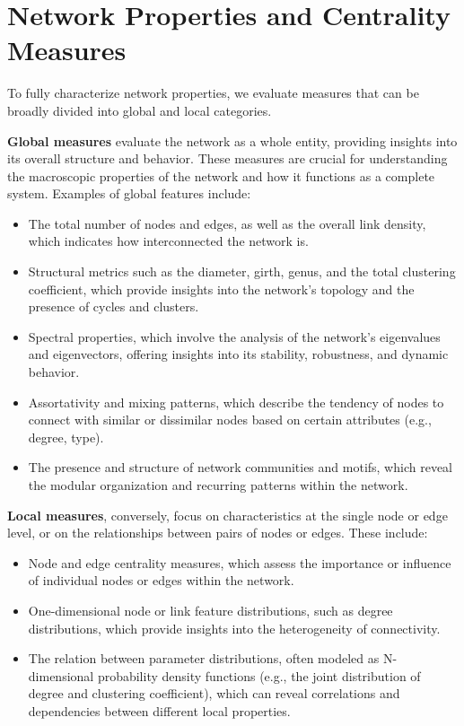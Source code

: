 \chapter{Network Properties and Centrality Measures}

To fully characterize network properties, we evaluate measures that can be broadly divided into global and local categories.

\textbf{Global measures} evaluate the network as a whole entity, providing insights into its overall structure and behavior. These measures are crucial for understanding the macroscopic properties of the network and how it functions as a complete system. Examples of global features include:
\begin{itemize}
    \item The total number of nodes and edges, as well as the overall link density, which indicates how interconnected the network is.
    \item Structural metrics such as the diameter, girth, genus, and the total clustering coefficient, which provide insights into the network's topology and the presence of cycles and clusters.
    \item Spectral properties, which involve the analysis of the network's eigenvalues and eigenvectors, offering insights into its stability, robustness, and dynamic behavior.
    \item Assortativity and mixing patterns, which describe the tendency of nodes to connect with similar or dissimilar nodes based on certain attributes (e.g., degree, type).
    \item The presence and structure of network communities and motifs, which reveal the modular organization and recurring patterns within the network.
\end{itemize}

\textbf{Local measures}, conversely, focus on characteristics at the single node or edge level, or on the relationships between pairs of nodes or edges. These include:
\begin{itemize}
    \item Node and edge centrality measures, which assess the importance or influence of individual nodes or edges within the network.
    \item One-dimensional node or link feature distributions, such as degree distributions, which provide insights into the heterogeneity of connectivity.
    \item The relation between parameter distributions, often modeled as N-dimensional probability density functions (e.g., the joint distribution of degree and clustering coefficient), which can reveal correlations and dependencies between different local properties.
\end{itemize}

